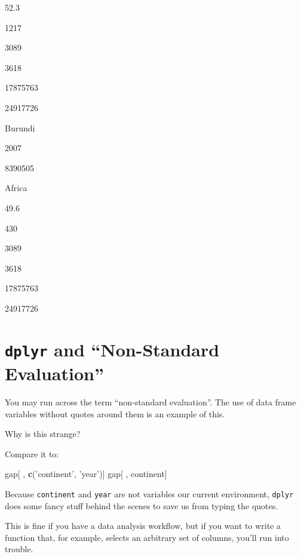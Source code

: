 \documentclass[]{book}
\newenvironment{Shaded}{\begin{snugshade}}{\end{snugshade}}
\newcommand{\KeywordTok}[1]{\textcolor[rgb]{0.13,0.29,0.53}{\textbf{#1}}}
\newcommand{\StringTok}[1]{\textcolor[rgb]{0.31,0.60,0.02}{#1}}
\newcommand{\OperatorTok}[1]{\textcolor[rgb]{0.81,0.36,0.00}{\textbf{#1}}}
\newcommand{\NormalTok}[1]{#1}
\begin{document}
52.3

1217

3089

3618

17875763

24917726

Burundi

2007

8390505

Africa

49.6

430

3089

3618

17875763

24917726

\section{\texorpdfstring{\texttt{dplyr} and ``Non-Standard
Evaluation''}{dplyr and Non-Standard Evaluation}}\label{dplyr-and-non-standard-evaluation}

You may run across the term ``non-standard evaluation''. The use of data
frame variables without quotes around them is an example of this.

Why is this strange?

\begin{Shaded}
\end{Shaded}

Compare it to:

\begin{Shaded}
\begin{Highlighting}[]
\NormalTok{gap[ , }\KeywordTok{c}\NormalTok{(}\StringTok{'continent'}\NormalTok{, }\StringTok{'year'}\NormalTok{)]}
\NormalTok{gap[ , continent]}
\end{Highlighting}
\end{Shaded}

Because \texttt{continent} and \texttt{year} are not variables our
current environment, \texttt{dplyr} does some fancy stuff behind the
scenes to save us from typing the quotes.

This is fine if you have a data analysis workflow, but if you want to
write a function that, for example, selects an arbitrary set of columns,
you'll run into trouble.
\end{document}
